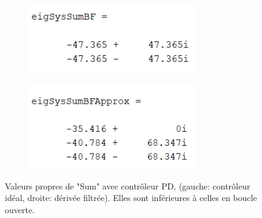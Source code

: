 \documentclass{report}
\begin{document}
\begin{figure}[h]  %
    \begin{subfigure}{.5\textwidth}
        \centering
        \includegraphics[width=0.8\textwidth]{figures/eigSysSumBF.png}        
      \end{subfigure}    
      \begin{subfigure}{.5\textwidth}
        \centering
        \includegraphics[width=0.8\textwidth]{figures/eigSysSumBFApprox.png}
      \end{subfigure}    
      \caption{Valeurs propres de "Sum" avec contrôleur PD, 
      (gauche: contrôleur idéal, droite: dérivée filtrée).
      Elles sont inférieures à celles en boucle ouverte.}
\end{figure}
\end{document}
